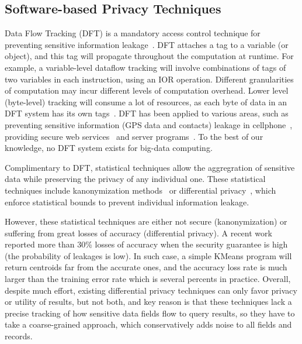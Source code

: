 \vspace{-.15in}\subsection{Software-based Privacy Techniques}
\label{sec:dft}\vspace{-.075in}

Data Flow Tracking (DFT) is a mandatory access control technique for preventing 
sensitive information leakage~\cite{dawn05:taint}. DFT attaches a tag to a 
variable (or object), and this tag will propagate throughout the computation at 
runtime. For example, a variable-level dataflow tracking will involve 
combinations of tags of two variables in each instruction, using an IOR 
operation. Different granularities of computation may incur different levels of 
computation overhead. Lower level (\eg byte-level) tracking will consume a lot 
of resources, as each byte of data in an DFT system has its own 
tags~\cite{libdft:vee12}. DFT has been applied to various areas, such as 
preventing sensitive information 
(\eg GPS data and contacts) leakage in cellphone~\cite{taintdroid:osdi10, 
cleanos:osdi12}, providing secure web services~\cite{cloudfence:raid13} and 
server programs~\cite{libdft:vee12}. To the best of our knowledge, no 
DFT system exists for big-data computing.
 


Complimentary to DFT, statistical techniques allow the aggregration of 
sensitive data while preserving the privacy of any individual one. These 
statistical techniques include k\-anonymization 
methods~\cite{kanonymity,icde06:ldiversity} or
differential privacy~\cite{gupt:sigmod12, pinq:sigmod09,airavat:nsdi10}, which 
enforce statistical bounds to prevent individual information leakage.

However, these statistical techniques are either not secure (k\-anonymization) 
or suffering from great losses of accuracy (differential privacy). A recent
work~\cite{differentialresult:vldb15} reported more than 30\% losses of accuracy 
when the security guarantee is high (the probability of leakages is low). In 
such case, a simple KMeans program will return centroids far from the accurate 
ones, and the accuracy loss rate is much larger than the training error rate 
which is several percents in practice. Overall, despite much effort, existing 
differential privacy techniques can only favor privacy or utility of results, 
but not both, and key reason is that these techniques lack a precise tracking 
of how sensitive data fields flow to query results, so they have to take a 
coarse-grained approach, which conservatively adds noise to all fields and 
records.


